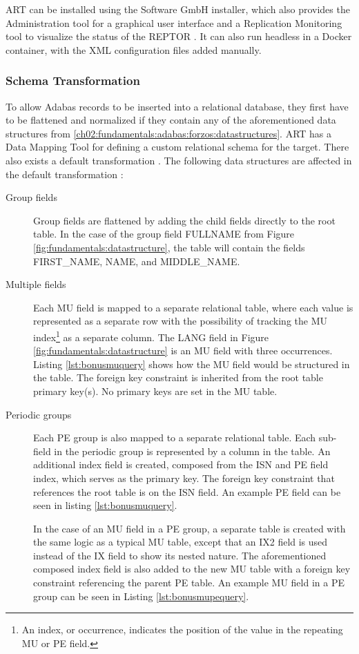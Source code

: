 \ac{ART} can be installed using the Software GmbH installer, which also provides the Administration tool for a graphical user interface and a Replication Monitoring tool to visualize the status of the \ac{REPTOR} \cite{artconcepts}. It can also run headless in a Docker container, with the XML configuration files added manually.

\subsubsection{Schema Transformation}
\label{ch02:fundamentals:adabas:art:schematransformation}
To allow Adabas records to be inserted into a relational database, they first have to be flattened and normalized if they contain any of the aforementioned data structures from \ref{ch02:fundamentals:adabas:forzos:datastructures}. \ac{ART} has a Data Mapping Tool for defining a custom relational schema for the target. There also exists a default transformation \cite{artconcepts}. The following data structures are affected in the default transformation \cite{artconcepts}:
\begin{description}
\item [Group fields]
Group fields are flattened by adding the child fields directly to the root table. In the case of the group field FULLNAME from Figure \ref{fig:fundamentals:datastructure}, the table will contain the fields FIRST\_NAME, NAME, and MIDDLE\_NAME.
\item [Multiple fields]
Each MU field is mapped to a separate relational table, where each value is represented as a separate row with the possibility of tracking the MU index\footnote{An index, or occurrence, indicates the position of the value in the repeating MU or PE field.} as a separate column. The LANG field in Figure \ref{fig:fundamentals:datastructure} is an MU field with three occurrences. Listing \ref{lst:bonusmuquery}  shows how the MU field would be structured in the table. The foreign key constraint is inherited from the root table primary key(s). No primary keys are set in the MU table.
\item[Periodic groups]
Each PE group is also mapped to a separate relational table. Each sub-field in the periodic group is represented by a column in the table. An additional index field is created, composed from the \ac{ISN} and PE field index, which serves as the primary key. The foreign key constraint that references the root table is on the \ac{ISN} field. An example PE field can be seen in listing \ref{lst:bonusmuquery}.

In the case of an MU field in a PE group, a separate table is created with the same logic as a typical MU table, except that an IX2 field is used instead of the IX field to show its nested nature. The aforementioned composed index field is also added to the new MU table with a foreign key constraint referencing the parent PE table. An example MU field in a PE group can be seen in Listing \ref{lst:bonusmupequery}.
\end{description}

